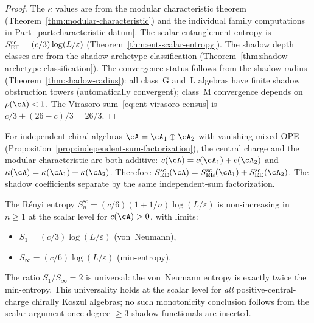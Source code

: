 \begin{proof}
The $\kappa$ values are from the modular characteristic
theorem (Theorem~\ref{thm:modular-characteristic})
and the individual family computations in Part~\ref{part:characteristic-datum}.
The scalar entanglement entropy is
$S_{\mathrm{EE}}^{\mathrm{sc}} = (c/3)\log(L/\varepsilon)$
(Theorem~\ref{thm:ent-scalar-entropy}).
The shadow depth classes are from the shadow archetype
classification
(Theorem~\ref{thm:shadow-archetype-classification}).
The convergence status follows from the shadow radius
(Theorem~\ref{thm:shadow-radius}):
all class~G and~L algebras have finite shadow obstruction towers
(automatically convergent); class~M convergence depends
on~$\rho(\cA) < 1$.
The Virasoro sum~\eqref{eq:ent-virasoro-census} is
$c/3 + (26-c)/3 = 26/3$.
\end{proof}

\begin{remark}
\label{rem:ent-additivity}
For independent chiral algebras $\cA = \cA_1 \oplus \cA_2$
with vanishing mixed OPE
(Proposition~\ref{prop:independent-sum-factorization}),
the central charge and the modular characteristic are both
additive:
$c(\cA)=c(\cA_1)+c(\cA_2)$ and
$\kappa(\cA) = \kappa(\cA_1) + \kappa(\cA_2)$.
Therefore
$S_{\EE}^{\mathrm{sc}}(\cA)
= S_{\EE}^{\mathrm{sc}}(\cA_1)+S_{\EE}^{\mathrm{sc}}(\cA_2)$.
The shadow coefficients separate by the same independent-sum
factorization.
\end{remark}

\begin{remark}
\label{rem:ent-renyi-monotone}
The R\'enyi entropy
$S_n^{\mathrm{sc}} = (c/6)(1+1/n)\log(L/\varepsilon)$
is non-increasing in $n \ge 1$ at the scalar level for
$c(\cA)>0$,
with limits:
\begin{itemize}
\item $S_1 = (c/3)\log(L/\varepsilon)$
 \;\textup{(}von~Neumann\textup{)},
\item $S_\infty = (c/6)\log(L/\varepsilon)$
 \;\textup{(}min-entropy\textup{)}.
\end{itemize}
The ratio $S_1/S_\infty = 2$ is universal: the
von~Neumann entropy is exactly twice the min-entropy.
This universality holds at the scalar level for \emph{all}
positive-central-charge chirally Koszul algebras; no such
monotonicity conclusion follows from the scalar argument once
degree-$\ge3$ shadow functionals are inserted.
\end{remark}

